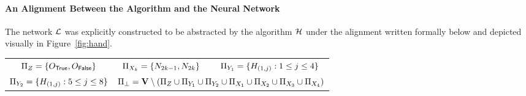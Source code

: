 \documentclass[twoside,11pt]{article}
\begin{document}
\paragraph{An Alignment Between the Algorithm and the Neural Network}
The network  $\mathcal{L}$ was explicitly constructed to be abstracted by the algorithm $\mathcal{H}$ under the alignment written formally below and depicted visually in Figure~\ref{fig:hand}.

\begin{center}
\begin{tabular}{c c c }
$\Pi_{Z} = \{O_{\mathsf{True}}, O_{\mathsf{False}}\}$ & $\Pi_{X_k} = \{N_{2k-1}, N_{2k}\}$ & $\Pi_{Y_1} = \{H_{(1,j)}: 1\leq j\leq4\}$ \\ 
 $\Pi_{Y_2} = \{H_{(1,j)}: 5 \leq j \leq 8\}$ & \multicolumn{2}{c}{$\Pi_{\bot} = \mathbf{V} \setminus (\Pi_{Z} \cup \Pi_{Y_1} \cup \Pi_{Y_2} \cup \Pi_{X_1} \cup \Pi_{X_2} \cup \Pi_{X_3} \cup \Pi_{X_4})$}\\
\end{tabular}\newline


\end{center}
\end{document}
